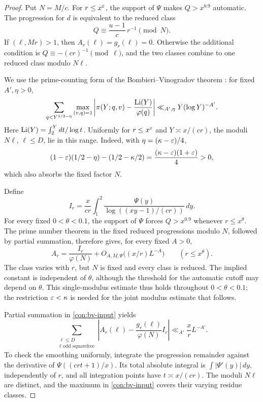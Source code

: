 \begin{proof}
Put \(N=M/c\).  For \(r\le x^\varepsilon\), the support of \(\Psi\)
makes \(Q>x^{0.9}\) automatic.  The progression for \(d\) is
equivalent to the reduced class
\[
 Q\equiv\frac{u-1}{c}\,r^{-1}\pmod N.
\]
If \((\ell,Mr)>1\), then \(A_r(\ell)=g_r(\ell)=0\).
Otherwise the additional condition is
\(Q\equiv-(cr)^{-1}\pmod\ell\), and the two classes combine to
one reduced class modulo \(N\ell\).

We use the prime-counting form of the Bombieri--Vinogradov theorem
\cite{Bombieri65,Vinogradov65}: for fixed \(A',\eta>0\),
\begin{equation}\label{con:bv-input}
 \sum_{q<Y^{1/2-\eta}}\max_{(v,q)=1}
 \left|\pi(Y;q,v)-\frac{\operatorname{Li}(Y)}{\varphi(q)}\right|
       \ll_{A',\eta}Y(\log Y)^{-A'}.
\end{equation}
Here \(\operatorname{Li}(Y)=\int_2^Ydt/\log t\).  Uniformly for
\(r\le x^\varepsilon\) and \(Y\asymp x/(cr)\), the moduli
\(N\ell\), \(\ell\le D\), lie in this range.  Indeed, with
\(\eta=(\kappa-\varepsilon)/4\),
\[
 (1-\varepsilon)(1/2-\eta)-(1/2-\kappa/2)
       =\frac{(\kappa-\varepsilon)(1+\varepsilon)}4>0,
\]
which also absorbs the fixed factor \(N\).

Define
\[
 I_r=\frac{x}{cr}\int_1^2
               \frac{\Psi(y)}{\log((xy-1)/(cr))}\,dy.
\]
For every fixed \(0<\theta<0.1\), the support of \(\Psi\) forces
\(Q>x^{0.9}\) whenever \(r\le x^\theta\). The prime number theorem
in the fixed reduced progressions modulo \(N\), followed by partial
summation, therefore gives, for every fixed \(A>0\),
\begin{equation}\label{con:fixed-r-mass}
 A_r=\frac{I_r}{\varphi(N)}
      +O_{A,M,\Psi}\bigl((x/r)L^{-A}\bigr)
 \qquad(r\le x^\theta).
\end{equation}
The class varies with \(r\), but \(N\) is fixed and every class is
reduced. The implied constant is independent of \(\theta\), although
the threshold for the automatic cutoff may depend on \(\theta\).
This single-modulus estimate thus holds throughout
\(0<\theta<0.1\); the restriction \(\varepsilon<\kappa\) is needed for
the joint modulus estimate that follows.

Partial summation in \eqref{con:bv-input} yields
\begin{equation}\label{con:smoothed-bv}
 \sum_{\substack{\ell\le D\\\ell\text{ odd squarefree}}}
 \left|A_r(\ell)-\frac{g_r(\ell)}{\varphi(N)}I_r\right|
       \ll_{A'}\frac xrL^{-A'}.
\end{equation}
To check the smoothing uniformly, integrate the progression remainder
against the derivative of \(\Psi((crt+1)/x)\).  Its total absolute
integral is \(\int|\Psi'(y)|\,dy\), independently of \(r\), and
all integration points have \(t\asymp x/(cr)\).  The moduli
\(N\ell\) are distinct, and the maximum in \eqref{con:bv-input}
covers their varying residue classes.


\end{proof}
